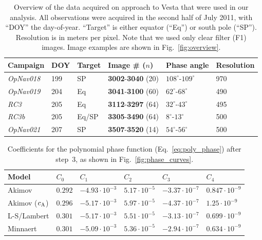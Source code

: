 \documentclass[3p,authoryear]{elsarticle}
\begin{document}
\newpage
\clearpage

\begin{table}
\centering
\caption{Overview of the data acquired on approach to Vesta that were used in our analysis. All observations were acquired in the second half of July 2011, with ``DOY'' the day-of-year. ``Target'' is either equator (``Eq'') or south pole (``SP''). Resolution is in meters per pixel. Note that we used only clear filter (F1) images. Image examples are shown in Fig.~\ref{fig:overview}.}
\vspace{5mm}
\begin{tabular}{llllll}
\hline
Campaign & DOY & Target & Image \# ($n$) & Phase angle & Resolution \\
\hline
{\it OpNav018} & 199 & SP & {\bf 3002}-{\bf 3040} (20) & $108^\circ$-$109^\circ$ & 970 \\
{\it OpNav019} & 204 & Eq & {\bf 3041}-{\bf 3100} (60) & $62^\circ$-$68^\circ$ & 490 \\
{\it RC3} & 205 & Eq & {\bf 3112}-{\bf 3297} (64) & $32^\circ$-$43^\circ$ & 495 \\
{\it RC3b} & 205 & Eq/SP & {\bf 3305}-{\bf 3490} (64) & $8^\circ$-$13^\circ$ & 500 \\
{\it OpNav021} & 207 & SP & {\bf 3507}-{\bf 3520} (14) & $54^\circ$-$56^\circ$ & 500 \\
\hline
\end{tabular}
\label{tab:campaigns}
\end{table}


\begin{table}
\centering
\caption{Coefficients for the polynomial phase function (Eq.~\ref{eq:poly_phase}) after step~3, as shown in Fig.~\ref{fig:phase_curves}.}
\vspace{5mm}
\begin{tabular}{llllll}
\hline
Model & $C_0$ & $C_1$ & $C_2$ & $C_3$ & $C_4$ \\
\hline
Akimov & $0.292$ & $-4.93 \cdot 10^{-3}$ & $5.17 \cdot 10^{-5}$ & $-3.37 \cdot 10^{-7}$ & $0.847 \cdot 10^{-9}$ \\
Akimov ($c_{\rm A}$) & $0.296$ & $-5.17 \cdot 10^{-3}$ & $5.97 \cdot 10^{-5}$ & $-4.37 \cdot 10^{-7}$ & $1.25 \cdot 10^{-9}$ \\
L-S/Lambert & $0.301$ & $-5.17 \cdot 10^{-3}$ & $5.51 \cdot 10^{-5}$ & $-3.13 \cdot 10^{-7}$ & $0.699 \cdot 10^{-9}$ \\
Minnaert & $0.301$ & $-5.09 \cdot 10^{-3}$ & $5.36 \cdot 10^{-5}$ & $-2.94 \cdot 10^{-7}$ & $0.634 \cdot 10^{-9}$ \\
\hline
\end{tabular}
\label{tab:phase_coef}
\end{table}
\end{document}
